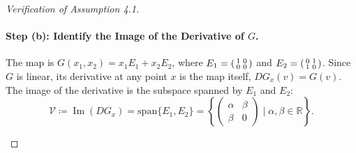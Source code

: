 \documentclass[12pt, letterpaper]{amsart}
\DeclareMathOperator{\Image}{Im}
\newcommand{\R}{\mathbb{R}}
\theoremstyle{plain}
\theoremstyle{definition}
\theoremstyle{remark}
\numberwithin{equation}{section} %
\begin{document}
\begin{appendices}
\begin{proof}[Verification of Assumption 4.1]
\begin{enumerate}[label=(\roman*)]
    \paragraph{Step (b): Identify the Image of the Derivative of $G$.}
    The map is $G(x_1, x_2) = x_1 E_1 + x_2 E_2$, where $E_1 = \begin{psmallmatrix} 1 & 0 \\ 0 & 0 \end{psmallmatrix}$ and $E_2 = \begin{psmallmatrix} 0 & 1 \\ 1 & 0 \end{psmallmatrix}$. Since $G$ is linear, its derivative at any point $x$ is the map itself, $DG_x(v) = G(v)$. The image of the derivative is the subspace spanned by $E_1$ and $E_2$:
    \[ \mathcal{V} \coloneqq \Image(DG_x) = \mathrm{span}\{E_1, E_2\} = \left\{ \begin{pmatrix} \alpha & \beta \\ \beta & 0 \end{pmatrix} \mid \alpha,\beta \in \R \right\}. \]

    

\end{enumerate}
\end{proof}
\end{appendices}
\end{document}
